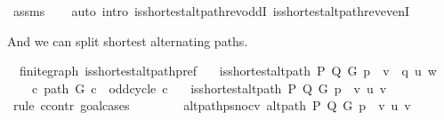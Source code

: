 \begin{isabellebody}
\ assms\isanewline
\ \ \isamarkupfalse%
\ {\isacharparenleft}{\kern0pt}auto\ intro{\isacharcolon}{\kern0pt}\ is{\isacharunderscore}{\kern0pt}shortest{\isacharunderscore}{\kern0pt}alt{\isacharunderscore}{\kern0pt}path{\isacharunderscore}{\kern0pt}rev{\isacharunderscore}{\kern0pt}oddI\ is{\isacharunderscore}{\kern0pt}shortest{\isacharunderscore}{\kern0pt}alt{\isacharunderscore}{\kern0pt}path{\isacharunderscore}{\kern0pt}rev{\isacharunderscore}{\kern0pt}evenI{\isacharparenright}{\kern0pt}%
\endisatagproof
{\isafoldproof}%
%
\isadelimproof
%
\endisadelimproof
%
\begin{isamarkuptext}%
And we can split shortest alternating paths.%
\end{isamarkuptext}\isamarkuptrue%
\isamarkupfalse%
\ {\isacharparenleft}{\kern0pt}\ finite{\isacharunderscore}{\kern0pt}graph{\isacharparenright}{\kern0pt}\ is{\isacharunderscore}{\kern0pt}shortest{\isacharunderscore}{\kern0pt}alt{\isacharunderscore}{\kern0pt}path{\isacharunderscore}{\kern0pt}pref{\isacharcolon}{\kern0pt}\isanewline
\ \ \ {\isachardoublequoteopen}is{\isacharunderscore}{\kern0pt}shortest{\isacharunderscore}{\kern0pt}alt{\isacharunderscore}{\kern0pt}path\ P\ Q\ G\ {\isacharparenleft}{\kern0pt}p\ {\isacharat}{\kern0pt}\ v\ {\isacharhash}{\kern0pt}\ q{\isacharparenright}{\kern0pt}\ u\ w{\isachardoublequoteclose}\isanewline
\ \ \ {\isachardoublequoteopen}{\isasymnot}\ {\isacharparenleft}{\kern0pt}{\isasymexists}c{\isachardot}{\kern0pt}\ path\ G\ c\ {\isasymand}\ odd{\isacharunderscore}{\kern0pt}cycle\ c{\isacharparenright}{\kern0pt}{\isachardoublequoteclose}\isanewline
\ \ \ {\isachardoublequoteopen}is{\isacharunderscore}{\kern0pt}shortest{\isacharunderscore}{\kern0pt}alt{\isacharunderscore}{\kern0pt}path\ P\ Q\ G\ {\isacharparenleft}{\kern0pt}p\ {\isacharat}{\kern0pt}\ {\isacharbrackleft}{\kern0pt}v{\isacharbrackright}{\kern0pt}{\isacharparenright}{\kern0pt}\ u\ v{\isachardoublequoteclose}\isanewline
%
\isadelimproof
%
\endisadelimproof
%
\isatagproof
{}\isamarkupfalse%
\ {\isacharparenleft}{\kern0pt}rule\ ccontr{\isacharcomma}{\kern0pt}\ goal{\isacharunderscore}{\kern0pt}cases{\isacharparenright}{\kern0pt}\isanewline
\ \ \isamarkupfalse%
\ {}\isanewline
\ \ \isamarkupfalse%
\ alt{\isacharunderscore}{\kern0pt}path{\isacharunderscore}{\kern0pt}p{\isacharunderscore}{\kern0pt}snoc{\isacharunderscore}{\kern0pt}v{\isacharcolon}{\kern0pt}\ {\isachardoublequoteopen}alt{\isacharunderscore}{\kern0pt}path\ P\ Q\ G\ {\isacharparenleft}{\kern0pt}p\ {\isacharat}{\kern0pt}\ {\isacharbrackleft}{\kern0pt}v{\isacharbrackright}{\kern0pt}{\isacharparenright}{\kern0pt}\ u\ v{\isachardoublequoteclose}\isanewline

\end{isabellebody}
